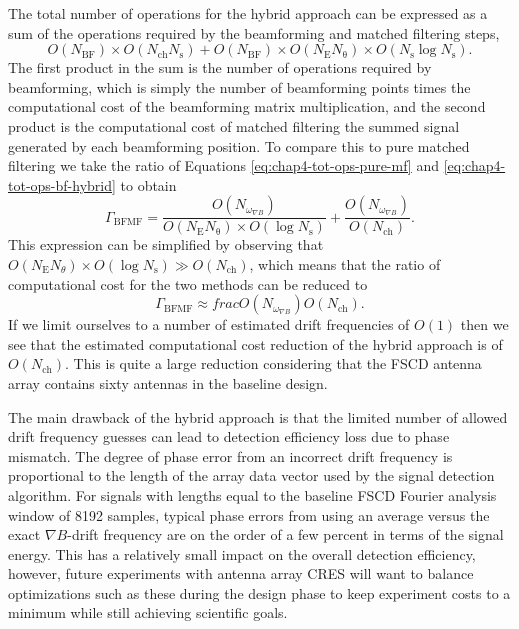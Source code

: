 The total number of operations for the hybrid approach can be expressed as a sum of the operations required by the beamforming and matched filtering steps,
\begin{equation}
    O(N_\mathrm{BF})\times O(N_\mathrm{ch}N_\mathrm{s}) + O(N_\mathrm{BF})\times O(N_\mathrm{E}N_\mathrm{\theta})\times O(N_\mathrm{s}\log{N_\mathrm{s}}).
    \label{eq:chap4-tot-ops-bf-hybrid}
\end{equation}
The first product in the sum is the number of operations required by beamforming, which is simply the number of beamforming points times the computational cost of the beamforming matrix multiplication, and the second product is the computational cost of matched filtering the summed signal generated by each beamforming position. To compare this to pure matched filtering we take the ratio of Equations \ref{eq:chap4-tot-ops-pure-mf} and \ref{eq:chap4-tot-ops-bf-hybrid} to obtain 
\begin{equation}
    \Gamma_\mathrm{BFMF}=\frac{O(N_{\omega_{\nabla B}})}{O(N_\mathrm{E}N_\mathrm{\theta})\times O(\log{N_\mathrm{s}})} + \frac{O(N_{\omega_{\nabla B}})}{O(N_\mathrm{ch})}.
\end{equation}
This expression can be simplified by observing that $O(N_\mathrm{E}N_\theta)\times O(\log{N_\mathrm{s}})\gg O(N_\mathrm{ch})$, which means that the ratio of computational cost for the two methods can be reduced to
\begin{equation}
    \Gamma_\mathrm{BFMF}\approx frac{O(N_{\omega_{\nabla B}})}{O(N_\mathrm{ch})}.
\end{equation} 
If we limit ourselves to a number of estimated drift frequencies of $O(1)$ then we see that the estimated computational cost reduction of the hybrid approach is of $O(N_\mathrm{ch})$. This is quite a large reduction considering that the FSCD antenna array contains sixty antennas in the baseline design. 

The main drawback of the hybrid approach is that the limited number of allowed drift frequency guesses can lead to detection efficiency loss due to phase mismatch. The degree of phase error from an incorrect drift frequency is proportional to the length of the array data vector used by the signal detection algorithm. For signals with lengths equal to the baseline FSCD Fourier analysis window of 8192 samples, typical phase errors from using an average versus the exact $\nabla B$-drift frequency are on the order of a few percent in terms of the signal energy. This has a relatively small impact on the overall detection efficiency, however, future experiments with antenna array CRES will want to balance optimizations such as these during the design phase to keep experiment costs to a minimum while still achieving scientific goals.

